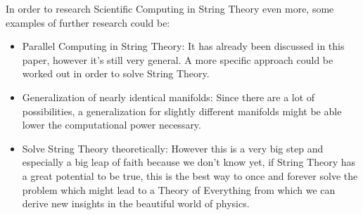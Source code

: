 \documentclass[../paper.tex]{subfiles}
\begin{document}
In order to research Scientific Computing in String Theory even more, some examples of further research could be:
\begin{itemize}
    \item Parallel Computing in String Theory:
    It has already been discussed in this paper, however it's still very general. A more specific approach could be worked out in order to solve String Theory.
    \item Generalization of nearly identical manifolds:
    Since there are a lot of possibilities, a generalization for slightly different manifolds might be able lower the computational power necessary.
    \item Solve String Theory theoretically:
    However this is a very big step and especially a big leap of faith because we don't know yet, if String Theory has a great potential to be true, this is the best way to once and forever solve the problem which might lead to a Theory of Everything from which we can derive new insights in the beautiful world of physics.
\end{itemize}
\end{document}
